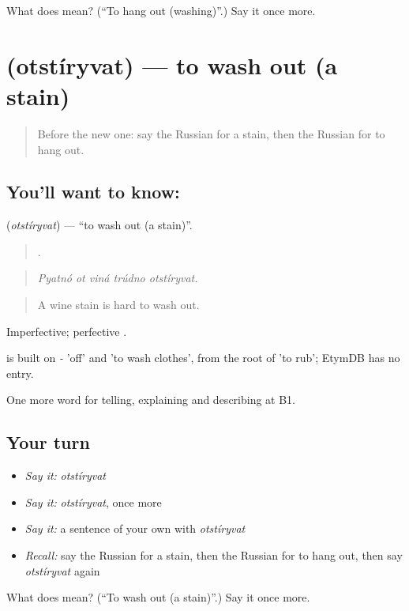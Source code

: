 \begin{tcolorbox}[breakable,colback=teal!4,colframe=teal!35!black,title={Before you move on}]
What does  mean? (\textquotedblleft{}To hang out (washing)\textquotedblright{}.) Say it once more.
\end{tcolorbox}
\section[\texorpdfstring{\ru{отстирывать} (otstíryvat)}{отстирывать (otstíryvat)}]{ (otstíryvat) — to wash out (a stain)}

\label{lesson:RU-C530-otstiryvat}



\begin{quote}
Before the new one: say the Russian for a stain, then the Russian for to hang out.
\end{quote}

\subsection*{You'll want to know: }
\textbf{} (\emph{otstíryvat}) — \textquotedblleft{}to wash out (a stain)\textquotedblright{}.

\begin{quote}
    .
\end{quote}

\begin{quote}
\emph{Pyatnó ot viná trúdno otstíryvat.}
\end{quote}

\begin{quote}
A wine stain is hard to wash out.
\end{quote}

Imperfective; perfective .

\begin{cousinweb}
\emph{} is built on \emph{-} 'off' and \emph{} 'to wash clothes', from the root of \emph{} 'to rub'; EtymDB has no entry.
\end{cousinweb}

\begin{grammarlens}[title={What you've built}]
One more word for telling, explaining and describing at B1.
\end{grammarlens}

\subsection*{Your turn}
\begin{itemize}
\raggedright
  \item \emph{Say it:} \emph{otstíryvat}
  \item \emph{Say it:} \emph{otstíryvat}, once more
  \item \emph{Say it:} a sentence of your own with \emph{otstíryvat}
  \item \emph{Recall:} say the Russian for a stain, then the Russian for to hang out, then say \emph{otstíryvat} again
\end{itemize}

\begin{tcolorbox}[breakable,colback=teal!4,colframe=teal!35!black,title={Before you move on}]
What does  mean? (\textquotedblleft{}To wash out (a stain)\textquotedblright{}.) Say it once more.
\end{tcolorbox}
